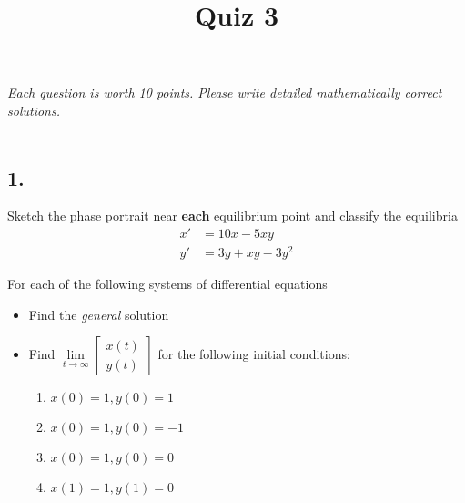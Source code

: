 

\usepackage{multicol}


\title{Quiz 3}


\maketitle

\thispagestyle{fancy}





\emph{Each question is worth 10 points. Please write detailed mathematically correct solutions.}\\\\




\subsection*{1. }
Sketch the phase portrait near \textbf{each} equilibrium point and classify the equilibria
\begin{align*}
	x' & = 10x - 5xy      \\
	y' & = 3y + xy - 3y^2
\end{align*}
\vspace{2em}





For each of the following systems of differential equations
\begin{itemize}
	\item Find the \emph{general} solution
	\item Find $\lim \limits_{t \rightarrow \infty} \begin{bmatrix}x(t) \\ y(t)\end{bmatrix}$ for the following initial conditions:
	      \begin{multicols}{2}
	      	\begin{enumerate}
	      		\item $x(0) = 1, y(0) = 1$
	      		\item $x(0) = 1, y(0) = -1$
	      		\item $x(0) = 1, y(0) = 0$
	      		\item $x(1) = 1, y(1) = 0$
	      	\end{enumerate}
	      \end{multicols}
\end{itemize}
\vspace{0.5em}






